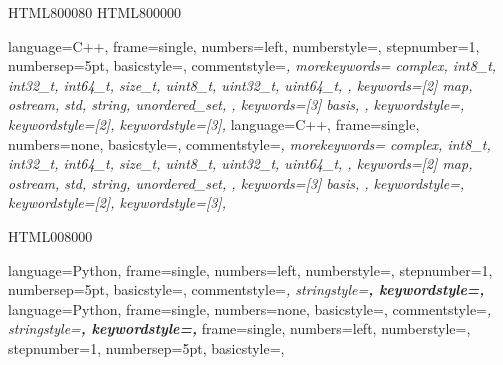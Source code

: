 \definecolor{col_cppclasses} {HTML}{800080}
\definecolor{col_cppmembers} {HTML}{800000}

{
  language=C++,          %
  frame=single,
  numbers=left,
  numberstyle=\footnotesize,
  stepnumber=1,
  numbersep=5pt,
  basicstyle=\footnotesize\ttfamily\color{black},
  commentstyle=\itshape\color{gray},
  morekeywords={
    complex,
    int8_t, int32_t, int64_t,
    size_t,
    uint8_t, uint32_t, uint64_t,
  },
  keywords=[2]{
    map,
    ostream,
    std, string,
    unordered_set,
  },
  keywords=[3]{
      basis,
  },
  keywordstyle=\color{col_cppkeywords},
  keywordstyle=[2]\color{col_cppclasses},
  keywordstyle=[3]\color{col_cppmembers},
}
{
  language=C++,          %
  frame=single,
  numbers=none,
  basicstyle=\ttfamily\color{black},
  commentstyle=\itshape\color{gray},
  morekeywords={
    complex,
    int8_t, int32_t, int64_t,
    size_t,
    uint8_t, uint32_t, uint64_t,
  },
  keywords=[2]{
    map,
    ostream,
    std, string,
    unordered_set,
  },
  keywords=[3]{
      basis,
  },
  keywordstyle=\color{col_cppkeywords},
  keywordstyle=[2]\color{col_cppclasses},
  keywordstyle=[3]\color{col_cppmembers},
}
\newcommand{\lcpp}[1]{\lstinline[style=CPPinline]{#1}}

\definecolor{col_pystrings} {HTML}{008000}

{
  language=Python,
  frame=single,
  numbers=left,
  numberstyle=\footnotesize,
  stepnumber=1,
  numbersep=5pt,
  basicstyle=\footnotesize\ttfamily\color{black},
  commentstyle=\itshape\color{col_pycomments},
  stringstyle=\bfseries\color{col_pystrings},
  keywordstyle=\bfseries\color{col_pykeywords},
}
{
  language=Python,
  frame=single,
  numbers=none,
  basicstyle=\ttfamily\color{black},
  commentstyle=\itshape\color{col_pycomments},
  stringstyle=\bfseries\color{col_pystrings},
  keywordstyle=\bfseries\color{col_pykeywords},
}
{
  frame=single,
  numbers=left,
  numberstyle=\footnotesize,
  stepnumber=1,
  numbersep=5pt,
  basicstyle=\footnotesize\ttfamily\color{black},
}


\newcommand{\lpy}[1]{\lstinline[style=Pyinline]{#1}}

